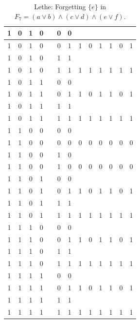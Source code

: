 \begin{table}[!tb]
\begin{tabular}{|c|c|c|c|c|c|c|c|c|c|c|c|c|}
        \rowcolor{gray!40} 1 & 0 & 1 & 0 &  & 0 & 0 &  &  &  &  &  &  \\ \hline
        \rowcolor{gray!40} 1 & 0 & 1 & 0 &  & 0 & 1 & 1 & 0 & 1 & 1 & 0 & 1 \\ \hline
        \rowcolor{blue!40} 1 & 0 & 1 & 0 &  & 1 & 1 &  &  &  &  &  &  \\ \hline
        \rowcolor{blue!40} 1 & 0 & 1 & 0 &  & 1 & 1 & 1 & 1 & 1 & 1 & 1 & 1 \\ \hline
        \rowcolor{red!40} 1 & 0 & 1 & 1 &  & 0 & 0 &  &  &  &  &  &  \\ \hline
        \rowcolor{red!40} 1 & 0 & 1 & 1 &  & 0 & 1 & 1 & 0 & 1 & 1 & 0 & 1 \\ \hline
        \rowcolor{green!40} 1 & 0 & 1 & 1 &  & 1 & 1 &  &  &  &  &  &  \\ \hline
        \rowcolor{green!40} 1 & 0 & 1 & 1 &  & 1 & 1 & 1 & 1 & 1 & 1 & 1 & 1 \\ \hline
        \rowcolor{yellow!40} 1 & 1 & 0 & 0 &  & 0 & 0 &  &  &  &  &  &  \\ \hline
        \rowcolor{yellow!40} 1 & 1 & 0 & 0 &  & 0 & 0 & 0 & 0 & 0 & 0 & 0 & 0 \\ \hline
        \rowcolor{gray!40} 1 & 1 & 0 & 0 &  & 1 & 0 &  &  &  &  &  &  \\ \hline
        \rowcolor{gray!40} 1 & 1 & 0 & 0 &  & 1 & 0 & 0 & 0 & 0 & 0 & 0 & 0 \\ \hline
        \rowcolor{blue!40} 1 & 1 & 0 & 1 &  & 0 & 0 &  &  &  &  &  &  \\ \hline
        \rowcolor{blue!40} 1 & 1 & 0 & 1 &  & 0 & 1 & 1 & 0 & 1 & 1 & 0 & 1 \\ \hline
        \rowcolor{red!40} 1 & 1 & 0 & 1 &  & 1 & 1 &  &  &  &  &  &  \\ \hline
        \rowcolor{red!40} 1 & 1 & 0 & 1 &  & 1 & 1 & 1 & 1 & 1 & 1 & 1 & 1 \\ \hline
        \rowcolor{green!40} 1 & 1 & 1 & 0 &  & 0 & 0 &  &  &  &  &  &  \\ \hline
        \rowcolor{green!40} 1 & 1 & 1 & 0 &  & 0 & 1 & 1 & 0 & 1 & 1 & 0 & 1 \\ \hline
        \rowcolor{yellow!40} 1 & 1 & 1 & 0 &  & 1 & 1 &  &  &  &  &  &  \\ \hline
        \rowcolor{yellow!40} 1 & 1 & 1 & 0 &  & 1 & 1 & 1 & 1 & 1 & 1 & 1 & 1 \\ \hline
        \rowcolor{gray!40} 1 & 1 & 1 & 1 &  & 0 & 0 &  &  &  &  &  &  \\ \hline
        \rowcolor{gray!40} 1 & 1 & 1 & 1 &  & 0 & 1 & 1 & 0 & 1 & 1 & 0 & 1 \\ \hline
        \rowcolor{blue!40} 1 & 1 & 1 & 1 &  & 1 & 1 &  &  &  &  &  &  \\ \hline
        \rowcolor{blue!40} 1 & 1 & 1 & 1 &  & 1 & 1 & 1 & 1 & 1 & 1 & 1 & 1 \\ \hline
    \end{tabular}
    \caption{Lethe: Forgetting $\{e\}$ in $F_{7} = (a \lor b) \land (c \lor d) \land (e \lor f)$.}
    \label{tab:lethe-F7-e}
\end{table}
